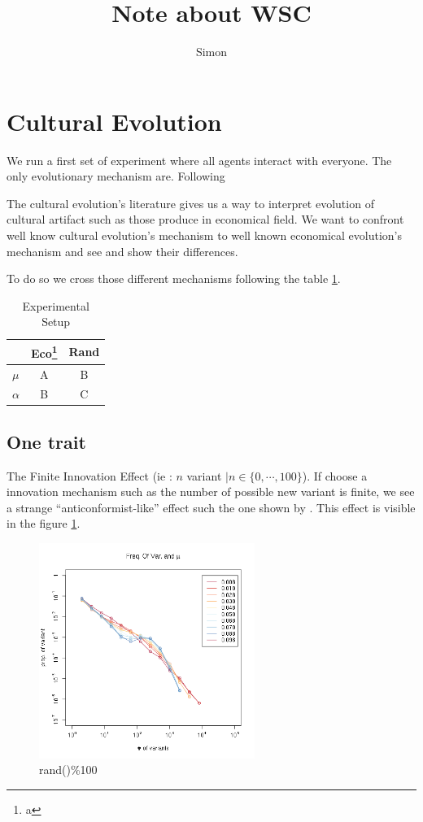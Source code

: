 \documentclass[a4paper]{article}
\title{Note about WSC}
\author{Simon}
\begin{document}
\maketitle
\section{Cultural Evolution}


We run a first set of experiment where all agents interact with everyone. The only evolutionary mechanism are. Following \cite{bentley2004randomdriftandculturechange}

The cultural evolution's literature gives us a way to interpret evolution of cultural artifact such as those produce in economical field. We want to confront well know cultural evolution's mechanism to well known economical evolution's mechanism and see and show their differences.

To do so we cross those different mechanisms following the table \ref{tab:exp}.
\begin{table}
	\centering
	\begin{tabular}{l|c|c}
		& Eco\footnote{a} & Rand \\\hline
		$\mu$ &A & B \\
		$\alpha$ & B & C \\
	\end{tabular}
	\caption{Experimental Setup}
	\label{tab:exp}
\end{table}

\subsection{One trait}

The Finite Innovation Effect (ie : $n$ variant  $| n\in\{0,\cdots,100\}$). If choose a innovation mechanism such as the number of possible new variant is finite, we see a strange ``anticonformist-like'' effect such the one shown by \cite{mesoudi2009randomcopyingfrequencydependencopyingandulturechange}. This effect is visible in the figure \ref{fig:finitEffect}.
\begin{figure}[h]
	\begin{center}
		\includegraphics[width=7cm]{img/allmu.png}
	\end{center}
	\caption{rand()\%100}
	\label{fig:finitEffect}
\end{figure}
\end{document}

